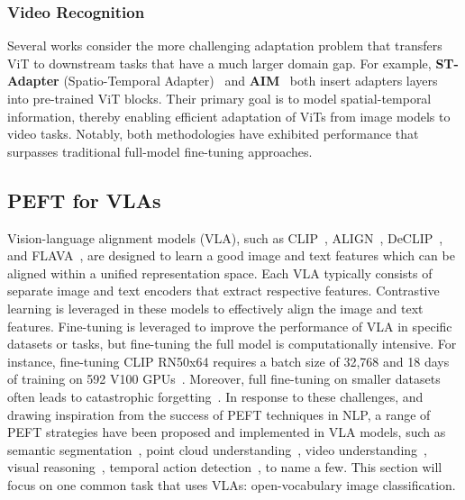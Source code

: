 \subsubsection{Video Recognition}

Several works consider the more challenging adaptation problem that transfers ViT to downstream tasks that have a much larger domain gap. For example, \textbf{ST-Adapter} (Spatio-Temporal Adapter)~\cite{pan2022st} and \textbf{AIM}~\cite{yang2023aim} both insert adapters layers into pre-trained ViT blocks. Their primary goal is to model spatial-temporal information, thereby enabling efficient adaptation of ViTs from image models to video tasks. Notably, both methodologies have exhibited performance that surpasses traditional full-model fine-tuning approaches.


\subsection{PEFT for VLAs}
\label{peft_on_vla}

Vision-language alignment models (VLA), such as CLIP~\cite{radford2021learning}, ALIGN~\cite{jia2021scaling}, DeCLIP~\cite{li2021supervision}, and FLAVA~\cite{singh2022flava}, are designed to learn a good image and text features which can be aligned within a unified representation space.
Each VLA typically consists of separate image and text encoders that extract respective features. Contrastive learning is leveraged in these models to effectively align the image and text features. 
Fine-tuning is leveraged to improve the performance of VLA in specific datasets or tasks, but fine-tuning the full model is computationally intensive. For instance, fine-tuning CLIP RN50x64 requires a batch size of 32,768 and 18 days of training on 592 V100 GPUs~\cite{radford2021learning}. Moreover, full fine-tuning on smaller datasets often leads to catastrophic forgetting~\cite{kirkpatrick2017overcoming}. In response to these challenges, and drawing inspiration from the success of PEFT techniques in NLP, a range of PEFT strategies have been proposed and implemented in VLA models, such as semantic segmentation~\cite{xu2023side, yu2023convolutions, xu2023bridging}, point cloud understanding~\cite{zhang2022pointclip, zhu2023pointclip, wang2022p2p, huang2023clip2point}, video understanding~\cite{ju2022prompting, ni2022expanding, lin2022frozen}, visual reasoning~\cite{han2023zero, doveh2023teaching}, temporal action detection~\cite{nag2022zero}, to name a few.
This section will focus on one common task that uses VLAs: open-vocabulary image classification.


